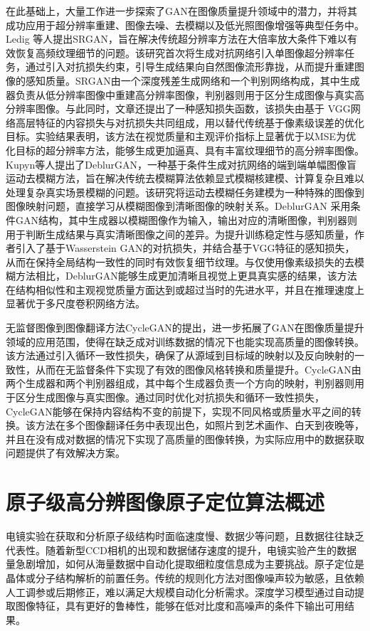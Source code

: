 在此基础上，大量工作进一步探索了GAN在图像质量提升领域中的潜力，并将其成功应用于超分辨率重建、图像去噪、去模糊以及低光照图像增强等典型任务中。Ledig 等人提出SRGAN\cite{ledig2017photo}，旨在解决传统超分辨率方法在大倍率放大条件下难以有效恢复高频纹理细节的问题。该研究首次将生成对抗网络引入单图像超分辨率任务，通过引入对抗损失约束，引导生成结果向自然图像流形靠拢，从而提升重建图像的感知质量。SRGAN由一个深度残差生成网络和一个判别网络构成，其中生成器负责从低分辨率图像中重建高分辨率图像，判别器则用于区分生成图像与真实高分辨率图像。与此同时，文章还提出了一种感知损失函数，该损失由基于 VGG网络高层特征的内容损失与对抗损失共同组成，用以替代传统基于像素级误差的优化目标。实验结果表明，该方法在视觉质量和主观评价指标上显著优于以MSE为优化目标的超分辨率方法，能够生成更加逼真、具有丰富纹理细节的高分辨率图像。Kupyn等人提出了DeblurGAN\cite{kupyn2018deblurgan}，一种基于条件生成对抗网络的端到端单幅图像盲运动去模糊方法，旨在解决传统去模糊算法依赖显式模糊核建模、计算复杂且难以处理复杂真实场景模糊的问题。该研究将运动去模糊任务建模为一种特殊的图像到图像映射问题，直接学习从模糊图像到清晰图像的映射关系。DeblurGAN 采用条件GAN结构，其中生成器以模糊图像作为输入，输出对应的清晰图像，判别器则用于判断生成结果与真实清晰图像之间的差异。为提升训练稳定性与感知质量，作者引入了基于Wasserstein GAN的对抗损失，并结合基于VGG特征的感知损失，从而在保持全局结构一致性的同时有效恢复细节纹理。与仅使用像素级损失的去模糊方法相比，DeblurGAN能够生成更加清晰且视觉上更具真实感的结果，该方法在结构相似性和主观视觉质量方面达到或超过当时的先进水平，并且在推理速度上显著优于多尺度卷积网络方法。

无监督图像到图像翻译方法CycleGAN\cite{zhu2017unpaired}的提出，进一步拓展了GAN在图像质量提升领域的应用范围，使得在缺乏成对训练数据的情况下也能实现高质量的图像转换。该方法通过引入循环一致性损失，确保了从源域到目标域的映射以及反向映射的一致性，从而在无监督条件下实现了有效的图像风格转换和质量提升。CycleGAN由两个生成器和两个判别器组成，其中每个生成器负责一个方向的映射，判别器则用于区分生成图像与真实图像。通过同时优化对抗损失和循环一致性损失，CycleGAN能够在保持内容结构不变的前提下，实现不同风格或质量水平之间的转换。该方法在多个图像翻译任务中表现出色，如照片到艺术画作、白天到夜晚等，并且在没有成对数据的情况下实现了高质量的图像转换，为实际应用中的数据获取问题提供了有效解决方案。

\section{原子级高分辨图像原子定位算法概述}
电镜实验在获取和分析原子级结构时面临速度慢、数据少等问题，且数据往往缺乏代表性。随着新型CCD相机的出现和数据储存速度的提升，电镜实验产生的数据量急剧增加，如何从海量数据中自动化提取细粒度信息成为主要挑战。原子定位是晶体或分子结构解析的前置任务。传统的规则化方法对图像噪声较为敏感，且依赖人工调参或后期修正，难以满足大规模自动化分析需求。深度学习模型通过自动提取图像特征，具有更好的鲁棒性，能够在低对比度和高噪声的条件下输出可用结果。

